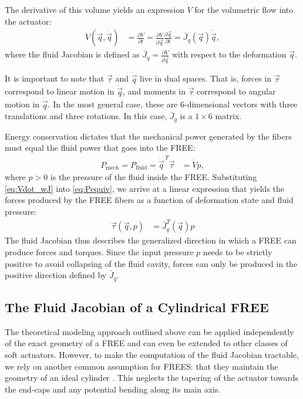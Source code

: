 The derivative of this volume yields an expression $\dot{V}$ for the volumetric flow into the actuator:
\begin{align}
    \dot{V} (\vec{q}, \dot{\vec{q}}) &= \frac{\partial V}{\partial t} = \frac{\partial V}{\partial \vec{q}} \frac{\partial \vec{q}}{\partial t } = \bar{J}_q (\vec{q}) \dot{\vec{q}},  \label{eq:Vdot_wJ}
\end{align}
where the fluid Jacobian is defined as $\bar{J}_{q}= \frac{\partial V}{\partial \vec{q}}$ with respect to the deformation $\vec{q}$. 


It is important to note that $\vec{\tau}$ and $\dot{\vec{q}}$ live in dual spaces. 
That is, forces in $\vec{\tau}$ correspond to linear motion in $\dot{\vec{q}}$, and moments in $\vec{\tau}$ correspond to angular motion in $\dot{\vec{q}}$.
In the most general case, these are 6-dimensional vectors with three translations and three rotations.
In this case, $\bar{J}_q$ is a $1 \times 6$ matrix.


Energy conservation dictates that the mechanical power generated by the fibers must equal the fluid power that goes into the FREE:
\begin{align}
    P_{\text{mech}} = P_{\text{fluid}} = \dot{\vec{q}}^{\,T} \vec{\tau} &= \dot{V} p, 
    \label{eq:Pequiv}
\end{align}
%
where $p>0$ is the pressure of the fluid inside the FREE.
Substituting \eqref{eq:Vdot_wJ} into \eqref{eq:Pequiv}, we arrive at a linear expression that yields the forces produced by the FREE fibers as a function of deformation state and fluid pressure: 
\begin{align}
    \vec{\tau} (\vec{q}, p) &= \bar{J}_q^T (\vec{q}) p       \label{eq:fiberF}
\end{align}
The fluid Jacobian thus describes the generalized direction in which a FREE can produce forces and torques.
Since the input pressure $p$ needs to be strictly positive to avoid collapsing of the fluid cavity, forces can only be produced in the positive direction defined by $\bar{J}_q$.


\subsection{The Fluid Jacobian of a Cylindrical FREE}
The theoretical modeling approach outlined above can be applied independently of the exact geometry of a FREE and can even be extended to other classes of soft actuators.
However, to make the computation of the fluid Jacobian tractable, we rely on another common assumption for FREES: that they maintain the geometry of an ideal cylinder \cite{bishop2015design}.
This neglects the tapering of the actuator towards the end-caps and any potential bending along its main axis.

